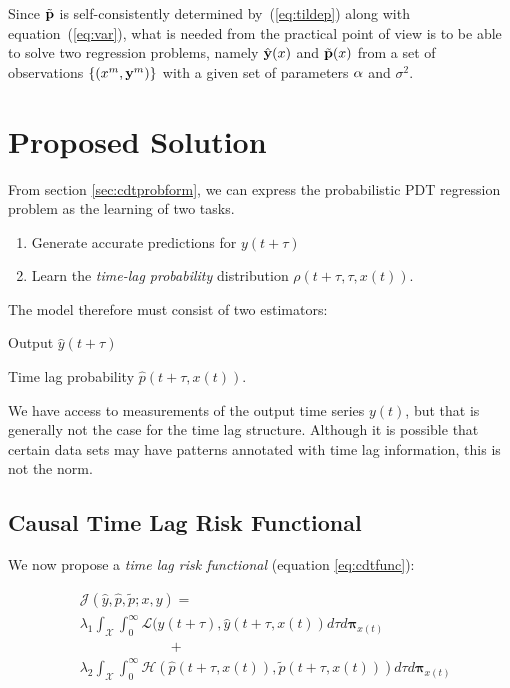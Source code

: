 \documentclass[envcountsect,runningheads]{llncs}
\theoremstyle{etoile}
\begin{document}
Since $\tilde {\bf p}$ is self-consistently determined by~(\ref{eq:tildep}) along with equation~(\ref{eq:var}), what is needed from the practical point of view is to be able
to solve two  regression problems, namely $\hat {\bf y}(x)$ and $\tilde {\bf p}(x)$ from a set of observations $\{(x^{m},{\bf y}^{m})\}$ with a given set of parameters ${\bf \alpha}$
and $\sigma^2$.







\section{Proposed Solution}\label{sec:model}

From section \ref{sec:cdtprobform}, we can express the probabilistic PDT regression 
problem as the learning of two tasks.

\begin{enumerate}
    \item Generate accurate predictions for $y(t + \tau)$
    \item Learn the \emph{time-lag probability} distribution $\rho(t + \tau, \tau, x(t))$.
\end{enumerate}

The model therefore must consist of two estimators:
\begin{inparaenum}[1.]
      \item Output $\hat{y}(t + \tau)$
      \item Time lag probability $\hat{p}(t + \tau, x(t))$.
\end{inparaenum} 
We have access to measurements of the output time series $y(t)$, but that is 
generally not the case for the time lag structure. Although it is possible 
that certain data sets may have patterns annotated with time lag information, 
this is not the norm.

\subsection{Causal Time Lag Risk Functional}

We now propose a \emph{time lag risk functional} 
(equation \ref{eq:cdtfunc}):

\begin{align}\label{eq:cdtfunc}
&\mathcal{J}(\hat{y}, \hat{p}, \tilde{p}; x, y) = \\
&\nonumber \lambda_1 \int_{\mathcal{X}}{
      \int_{0}^{\infty}{
            \mathcal{L}(y(t + \tau), \hat{y}(t + \tau, x(t))
      }
}d\tau d\mathbf{\pi}_{x(t)} \\ 
& \nonumber \hspace{78pt}  + \\ 
&\nonumber  \lambda_2 \int_{\mathcal{X}}{\int_{0}^{\infty}
{\mathcal{H}\left(\hat{p}(t + \tau, x(t)), \tilde{p}(t + \tau, x(t))\right)}}d\tau d\mathbf{\pi}_{x(t)}
\end{align}
\end{document}
